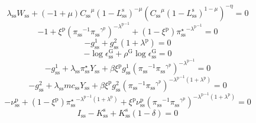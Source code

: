\begin{equation}
{\lambda_\mathrm{ss}} {W_\mathrm{ss}} + \left(-1 + \mu\right) {{C_\mathrm{ss}}^{\mu}} {\left(1 - L^{\mathrm{s}}_\mathrm{ss}\right)^{-\mu}} {\left({{C_\mathrm{ss}}^{\mu}} {\left(1 - L^{\mathrm{s}}_\mathrm{ss}\right)^{1 - \mu}}\right)^{-\eta}} = 0
\end{equation}
\begin{equation}
-1 + {\xi^{\mathrm{p}}} {\left({\pi_\mathrm{ss}}^{-1} {{\pi_\mathrm{ss}}^{\gamma^{\mathrm{p}}}}\right)^{-{\lambda^{\mathrm{p}}}^{-1}}} + \left(1 - \xi^{\mathrm{p}}\right) {{\pi^{\star}_\mathrm{ss}}^{-{\lambda^{\mathrm{p}}}^{-1}}} = 0
\end{equation}
\begin{equation}
-g^{\mathrm{1}}_\mathrm{ss} + {g^{\mathrm{2}}_\mathrm{ss}} \left(1 + \lambda^{\mathrm{p}}\right) = 0
\end{equation}
\begin{equation}
-\log{\epsilon^{\mathrm{G}}_\mathrm{ss}} + {\rho^{\mathrm{G}}} {\log{\epsilon^{\mathrm{G}}_\mathrm{ss}}} = 0
\end{equation}
\begin{equation}
-g^{\mathrm{1}}_\mathrm{ss} + {\lambda_\mathrm{ss}} {\pi^{\star}_\mathrm{ss}} {Y_\mathrm{ss}} + {\beta} {\xi^{\mathrm{p}}} {g^{\mathrm{1}}_\mathrm{ss}} {\left({\pi_\mathrm{ss}}^{-1} {{\pi_\mathrm{ss}}^{\gamma^{\mathrm{p}}}}\right)^{-{\lambda^{\mathrm{p}}}^{-1}}} = 0
\end{equation}
\begin{equation}
-g^{\mathrm{2}}_\mathrm{ss} + {\lambda_\mathrm{ss}} {{m\!c}_\mathrm{ss}} {Y_\mathrm{ss}} + {\beta} {\xi^{\mathrm{p}}} {g^{\mathrm{2}}_\mathrm{ss}} {\left({\pi_\mathrm{ss}}^{-1} {{\pi_\mathrm{ss}}^{\gamma^{\mathrm{p}}}}\right)^{-{\lambda^{\mathrm{p}}}^{-1} \left(1 + \lambda^{\mathrm{p}}\right)}} = 0
\end{equation}
\begin{equation}
-\nu^{\mathrm{p}}_\mathrm{ss} + \left(1 - \xi^{\mathrm{p}}\right) {{\pi^{\star}_\mathrm{ss}}^{-{\lambda^{\mathrm{p}}}^{-1} \left(1 + \lambda^{\mathrm{p}}\right)}} + {\xi^{\mathrm{p}}} {\nu^{\mathrm{p}}_\mathrm{ss}} {\left({\pi_\mathrm{ss}}^{-1} {{\pi_\mathrm{ss}}^{\gamma^{\mathrm{p}}}}\right)^{-{\lambda^{\mathrm{p}}}^{-1} \left(1 + \lambda^{\mathrm{p}}\right)}} = 0
\end{equation}
\begin{equation}
I_\mathrm{ss} - K^{\mathrm{s}}_\mathrm{ss} + {K^{\mathrm{s}}_\mathrm{ss}} \left(1 - \delta\right) = 0
\end{equation}
